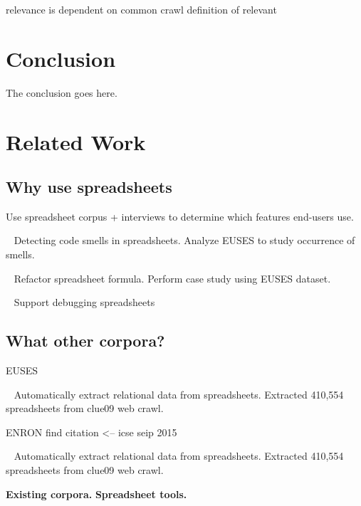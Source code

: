 \documentclass[conference]{IEEEtran}
\begin{document}

relevance is dependent on common crawl definition of relevant

\section{Conclusion}
The conclusion goes here.

\section{Related Work}


\subsection{Why use spreadsheets}

\cite{Chambers2010} Use spreadsheet corpus + interviews to determine which features end-users use.

~\cite{Pinzger2012} Detecting code smells in spreadsheets. Analyze EUSES to study occurrence of smells.

~\cite{Badame2012} Refactor spreadsheet formula. Perform case study using EUSES dataset.

~\cite{Abraham2007} Support debugging spreadsheets

\subsection{What other corpora?}
EUSES~\cite{Fisher2005}

~\cite{Chen2013} Automatically extract relational data from spreadsheets. Extracted 410,554 spreadsheets from clue09 web crawl.

ENRON find citation <-- icse seip 2015



~\cite{Chen2013} Automatically extract relational data from spreadsheets. Extracted 410,554 spreadsheets from clue09 web crawl.


\textbf{Existing corpora.}
\textbf{Spreadsheet tools.}
\end{document}
